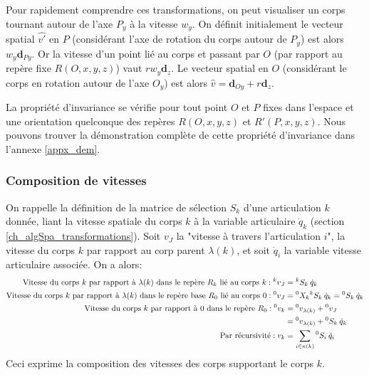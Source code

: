 \documentclass{report}
\begin{document}
Pour rapidement comprendre ces transformations, on peut visualiser un corps tournant autour de l'axe $P_{y}$ à la vitesse $w_{y}$. On définit initialement le vecteur spatial $\widehat{v'}$ en $P$ (\cad considérant l'axe de rotation du corps autour de $P_{y}$) est alors $w_{y}\textbf{d}_{Py}$. Or la vitesse d'un point lié au corps et passant par $O$ (par rapport au repère fixe $R(O,x,y,z)$) vaut $rw_{y}\textbf{d}_{z}$. Le vecteur spatial en $O$ (\cad considérant le corps en rotation autour de l'axe $O_{y}$) est alors $\widehat{v}=\textbf{d}_{Oy}+r\textbf{d}_{z}$.

La propriété d'invariance se vérifie pour tout point $O$ et $P$ fixes dans l'espace et une orientation quelconque des repères $R(O,x,y,z)$ et $R'(P,x,y,z)$. Nous pouvons trouver la démonstration complète de cette propriété d'invariance dans l'annexe \ref{appx_dem}.

\subsubsection*{Composition de vitesses}
On rappelle  la définition de la matrice de sélection $S_k$ d'une articulation $k$ donnée, liant la vitesse spatiale du corps $k$ à la variable articulaire $\dot{q}_k$ (section \ref{ch_algSpa_transformations}). Soit $v_J$ la "vitesse à travers l'articulation $i$", \cad la vitesse du corps $k$ par rapport au corp parent $\lambda(k)$, et soit $\dot{q}_i$ la variable vitesse articulaire associée. On a alors:
\begin{align}
\textnormal{Vitesse du corps $k$ par rapport à $\lambda(k)$ dans le repère $R_k$ lié au corps $k$} : {^kv_J} &= {^kS_k} \: \dot{q}_k \\
\textnormal{Vitesse du corps $k$ par rapport à $\lambda(k)$ dans le repère base $R_0$ lié au corps $0$} : {^0v_J} &= {^0X_k} {^kS_k} \: \dot{q}_k = {^0S_k} \: \dot{q}_k \\
\textnormal{Vitesse du corps $k$ par rapport à $0$ dans le repère $R_0$} : {^0v_k} &= {^0v_{\lambda(k)}} + {^0v_{J}} \\
&= {^0v_{\lambda(k)}} + {^0S_k} \: \dot{q}_k \\
\textnormal{Par récursivité} : v_k &= \sum_{i \in \kappa(k)} {^0S_i} \: \dot{q}_i
\end{align}
Ceci exprime la composition des vitesses des corps supportant le corps $k$.
\end{document}
